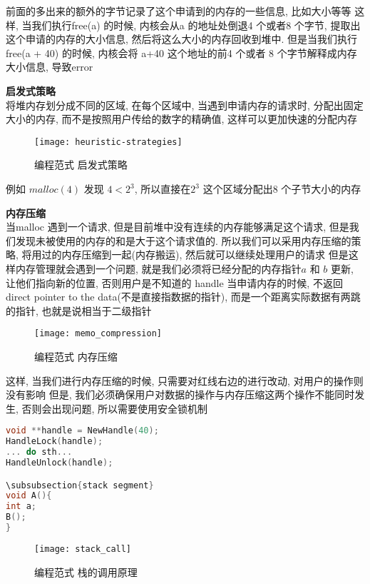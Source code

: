 \documentclass{article}
\begin{document}
前面的多出来的额外的字节记录了这个申请到的内存的一些信息, 比如大小等等
这样, 当我们执行free(a) 的时候, 内核会从a 的地址处倒退4 个或者8 个字节, 提取出这个申请的内存的大小信息, 然后将这么大小的内存回收到堆中.
但是当我们执行free(a + 40) 的时候, 内核会将 a+40 这个地址的前4 个或者 8 个字节解释成内存大小信息, 导致error

\bigskip
\textbf{启发式策略}\\
将堆内存划分成不同的区域, 在每个区域中, 当遇到申请内存的请求时, 分配出固定大小的内存, 而不是按照用户传给的数字的精确值, 这样可以更加快速的分配内存
\begin{figure}[htbp]
	\centering
	\texttt{[image: heuristic-strategies]}\\
	\caption{编程范式 启发式策略}\label{fig.heuristic-strategies}
\end{figure}

例如 $malloc(4)$ 发现 $4 < 2^3$, 所以直接在$2^3$ 这个区域分配出$8$ 个子节大小的内存

\textbf{内存压缩}\\
当malloc 遇到一个请求, 但是目前堆中没有连续的内存能够满足这个请求, 但是我们发现未被使用的内存的和是大于这个请求值的.
所以我们可以采用内存压缩的策略, 将用过的内存压缩到一起(内存搬运), 然后就可以继续处理用户的请求
但是这样内存管理就会遇到一个问题, 就是我们必须将已经分配的内存指针$a$ 和 $b$ 更新, 让他们指向新的位置, 否则用户是不知道的
handle
当申请内存的时候, 不返回direct pointer to the data(不是直接指数据的指针), 而是一个距离实际数据有两跳的指针, 也就是说相当于二级指针
\begin{figure}[htbp]
	\centering
	\texttt{[image: memo\_compression]}\\
	\caption{编程范式 内存压缩}\label{fig.memo.compression}
\end{figure}

这样, 当我们进行内存压缩的时候, 只需要对红线右边的进行改动, 对用户的操作则没有影响
但是, 我们必须确保用户对数据的操作与内存压缩这两个操作不能同时发生, 否则会出现问题, 所以需要使用安全锁机制
\begin{lstlisting}[language = C]
void **handle = NewHandle(40);
HandleLock(handle);
... do sth...
HandleUnlock(handle);

\subsubsection{stack segment}
void A(){
int a;
B();
}
\end{lstlisting}
\begin{figure}[htbp]
	\centering
	\texttt{[image: stack\_call]}\\
	\caption{编程范式 栈的调用原理}\label{fig.stack.call}
\end{figure}
\end{document}
